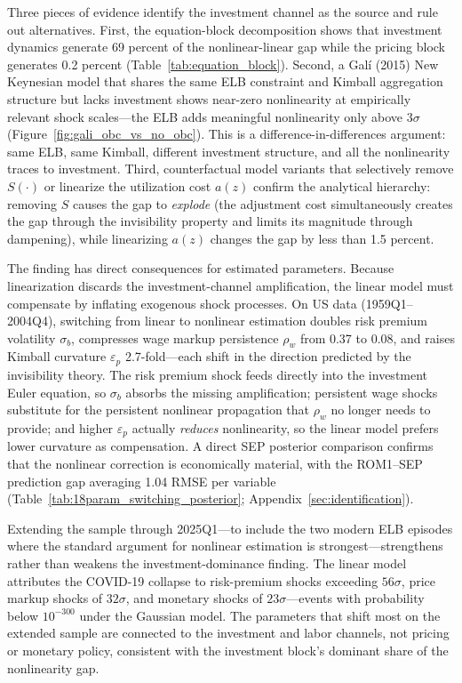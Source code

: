 \documentclass[12pt]{article}
\theoremstyle{plain}
\theoremstyle{definition}
\theoremstyle{remark}
\begin{document}
Three pieces of evidence identify the investment channel as the source and rule out alternatives. First, the equation-block decomposition shows that investment dynamics generate 69 percent of the nonlinear-linear gap while the pricing block generates 0.2 percent (Table~\ref{tab:equation_block}). Second, a Gal\'i (2015) New Keynesian model that shares the same ELB constraint and Kimball aggregation structure but lacks investment shows near-zero nonlinearity at empirically relevant shock scales---the ELB adds meaningful nonlinearity only above $3\sigma$ (Figure~\ref{fig:gali_obc_vs_no_obc}). This is a difference-in-differences argument: same ELB, same Kimball, different investment structure, and all the nonlinearity traces to investment. Third, counterfactual model variants that selectively remove $S(\cdot)$ or linearize the utilization cost $a(z)$ confirm the analytical hierarchy: removing $S$ causes the gap to \emph{explode} (the adjustment cost simultaneously creates the gap through the invisibility property and limits its magnitude through dampening), while linearizing $a(z)$ changes the gap by less than 1.5 percent.

The finding has direct consequences for estimated parameters. Because linearization discards the investment-channel amplification, the linear model must compensate by inflating exogenous shock processes. On US data (1959Q1--2004Q4), switching from linear to nonlinear estimation doubles risk premium volatility $\sigma_b$, compresses wage markup persistence $\rho_w$ from 0.37 to 0.08, and raises Kimball curvature $\varepsilon_p$ 2.7-fold---each shift in the direction predicted by the invisibility theory. The risk premium shock feeds directly into the investment Euler equation, so $\sigma_b$ absorbs the missing amplification; persistent wage shocks substitute for the persistent nonlinear propagation that $\rho_w$ no longer needs to provide; and higher $\varepsilon_p$ actually \emph{reduces} nonlinearity, so the linear model prefers lower curvature as compensation. A direct SEP posterior comparison confirms that the nonlinear correction is economically material, with the ROM1--SEP prediction gap averaging 1.04 RMSE per variable (Table~\ref{tab:18param_switching_posterior}; Appendix~\ref{sec:identification}).

Extending the sample through 2025Q1---to include the two modern ELB episodes where the standard argument for nonlinear estimation is strongest---strengthens rather than weakens the investment-dominance finding. The linear model attributes the COVID-19 collapse to risk-premium shocks exceeding $56\sigma$, price markup shocks of $32\sigma$, and monetary shocks of $23\sigma$---events with probability below $10^{-300}$ under the Gaussian model. The parameters that shift most on the extended sample are connected to the investment and labor channels, not pricing or monetary policy, consistent with the investment block's dominant share of the nonlinearity gap.
\end{document}
